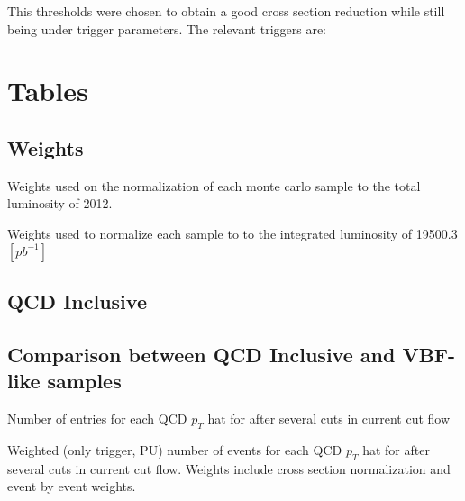 \documentclass[a4paper,10pt]{article}
\begin{document}
This thresholds were chosen to obtain a good cross section reduction while still being under trigger parameters. The relevant triggers are:



\section{Tables}

\subsection{Weights}

Weights used on the normalization of each monte carlo sample to the total luminosity of 2012.

\begin{table}[!h]
\centering

\caption{Weights used to normalize each sample to to the integrated luminosity of 19500.3 $[pb^{-1}]$}
\end{table}

\clearpage
\subsection{QCD Inclusive}

\begin{table}[!h]
\centering
\resizebox{\linewidth}{!}{}
\caption{}
\end{table}

\begin{table}[!h]
\centering

\caption{}
\end{table}

\clearpage
\subsection{Comparison between QCD Inclusive and VBF-like samples}

\begin{table}[!h]
\centering
\resizebox{\linewidth}{!}{}
\caption{Number of entries for each QCD $p_T$ hat for after several cuts in current cut flow}
\end{table}

\begin{table}[!h]
\centering
\resizebox{\linewidth}{!}{}
\caption{Weighted (only trigger, PU) number of events for each QCD $p_T$ hat for after several cuts in current cut flow. Weights include cross section normalization and event by event weights.}
\end{table}
\end{document}
